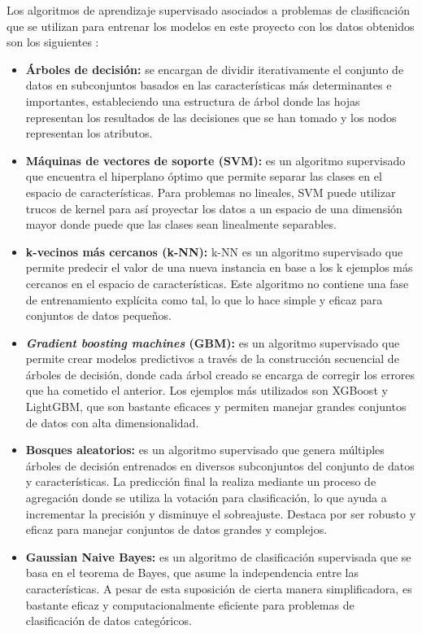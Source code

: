 Los algoritmos de aprendizaje supervisado asociados a problemas de clasificación que se utilizan para entrenar los modelos en este proyecto con los datos obtenidos son los siguientes \cite{algoritmos-supervisado}:
\begin{itemize}
    \item \textbf{Árboles de decisión:} se encargan de dividir iterativamente el conjunto de datos en subconjuntos basados en las características más determinantes e importantes, estableciendo una estructura de árbol donde las hojas representan los resultados de las decisiones que se han tomado y los nodos representan los atributos.
    \item \textbf{Máquinas de vectores de soporte (SVM):} es un algoritmo supervisado que encuentra el hiperplano óptimo que permite separar las clases en el espacio de características. Para problemas no lineales, SVM puede utilizar trucos de kernel para así proyectar los datos a un espacio de una dimensión mayor donde puede que las clases sean linealmente separables.
    \item \textbf{k-vecinos más cercanos (k-NN):} k-NN es un algoritmo supervisado que permite predecir el valor de una nueva instancia en base a los k ejemplos más cercanos en el espacio de características. Este algoritmo no contiene una fase de entrenamiento explícita como tal, lo que lo hace simple y eficaz para conjuntos de datos pequeños.
    \item \textbf{\textit{Gradient boosting machines} (GBM):} es un algoritmo supervisado que permite crear modelos predictivos a través de la construcción secuencial de árboles de decisión, donde cada árbol creado se encarga de corregir los errores que ha cometido el anterior. Los ejemplos más utilizados son XGBoost y LightGBM, que son bastante eficaces y permiten manejar grandes conjuntos de datos con alta dimensionalidad.
    \item \textbf{Bosques aleatorios:} es un algoritmo supervisado que genera múltiples árboles de decisión entrenados en diversos subconjuntos del conjunto de datos y características. La predicción final la realiza mediante un proceso de agregación donde se utiliza la votación para clasificación, lo que ayuda a incrementar la precisión y disminuye el sobreajuste. Destaca por ser robusto y eficaz para manejar conjuntos de datos grandes y complejos.
    \item \textbf{Gaussian Naive Bayes:} es un algoritmo de clasificación supervisada que se basa en el teorema de Bayes, que asume la independencia entre las características. A pesar de esta suposición de cierta manera simplificadora, es bastante eficaz y computacionalmente eficiente para problemas de clasificación de datos categóricos. 
\end{itemize}


